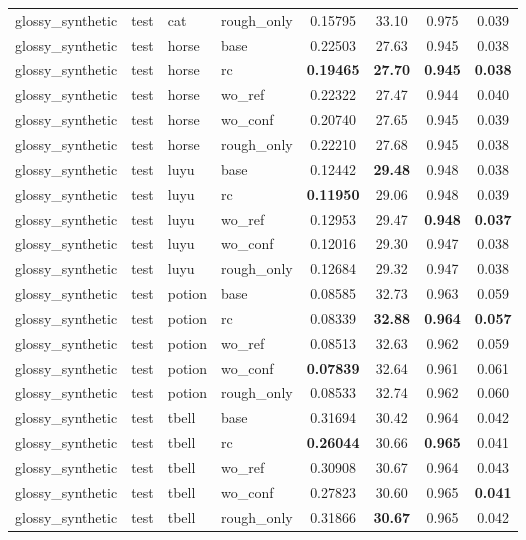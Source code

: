 \begin{table}[t]
{\begin{tabular}{llllcccc}
glossy\_synthetic & test & cat & rough\_only & 0.15795 & 33.10 & 0.975 & 0.039 \\
glossy\_synthetic & test & horse & base & 0.22503 & 27.63 & 0.945 & 0.038 \\
glossy\_synthetic & test & horse & rc & \textbf{0.19465} & \textbf{27.70} & \textbf{0.945} & \textbf{0.038} \\
glossy\_synthetic & test & horse & wo\_ref & 0.22322 & 27.47 & 0.944 & 0.040 \\
glossy\_synthetic & test & horse & wo\_conf & 0.20740 & 27.65 & 0.945 & 0.039 \\
glossy\_synthetic & test & horse & rough\_only & 0.22210 & 27.68 & 0.945 & 0.038 \\
glossy\_synthetic & test & luyu & base & 0.12442 & \textbf{29.48} & 0.948 & 0.038 \\
glossy\_synthetic & test & luyu & rc & \textbf{0.11950} & 29.06 & 0.948 & 0.039 \\
glossy\_synthetic & test & luyu & wo\_ref & 0.12953 & 29.47 & \textbf{0.948} & \textbf{0.037} \\
glossy\_synthetic & test & luyu & wo\_conf & 0.12016 & 29.30 & 0.947 & 0.038 \\
glossy\_synthetic & test & luyu & rough\_only & 0.12684 & 29.32 & 0.947 & 0.038 \\
glossy\_synthetic & test & potion & base & 0.08585 & 32.73 & 0.963 & 0.059 \\
glossy\_synthetic & test & potion & rc & 0.08339 & \textbf{32.88} & \textbf{0.964} & \textbf{0.057} \\
glossy\_synthetic & test & potion & wo\_ref & 0.08513 & 32.63 & 0.962 & 0.059 \\
glossy\_synthetic & test & potion & wo\_conf & \textbf{0.07839} & 32.64 & 0.961 & 0.061 \\
glossy\_synthetic & test & potion & rough\_only & 0.08533 & 32.74 & 0.962 & 0.060 \\
glossy\_synthetic & test & tbell & base & 0.31694 & 30.42 & 0.964 & 0.042 \\
glossy\_synthetic & test & tbell & rc & \textbf{0.26044} & 30.66 & \textbf{0.965} & 0.041 \\
glossy\_synthetic & test & tbell & wo\_ref & 0.30908 & 30.67 & 0.964 & 0.043 \\
glossy\_synthetic & test & tbell & wo\_conf & 0.27823 & 30.60 & 0.965 & \textbf{0.041} \\
glossy\_synthetic & test & tbell & rough\_only & 0.31866 & \textbf{30.67} & 0.965 & 0.042 \\

\end{tabular}}
\end{table}
